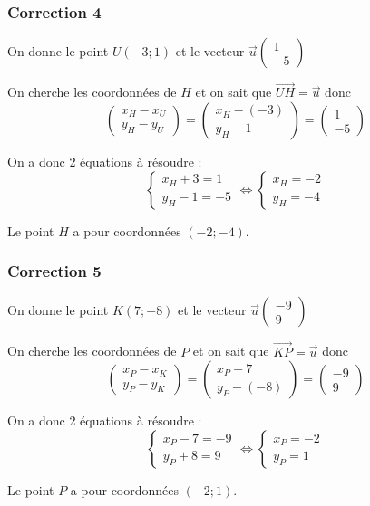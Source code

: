 \documentclass[15pt, mathserif]{beamer}
\begin{document}
\begin{frame}
\vspace{-10mm}
	\frametitle{Correction 4}
\vspace*{0.5cm} 
 On donne le point $U(-3;1)$ et le vecteur $\vec{u}\begin{pmatrix} 1\\ -5 \end{pmatrix}$ 
 
 On cherche les coordonnées de $H$ et on sait que $\vec{UH}=\vec{u}$ donc $$\begin{pmatrix} x_{H}-x_U \\ y_{H}-y_U \end{pmatrix}=\begin{pmatrix} x_{H}-\left(-3\right) \\ y_{H}-1\end{pmatrix}=\begin{pmatrix} 1 \\ -5 \end{pmatrix}$$ 
 
 On a donc 2 équations à résoudre :  
 $$ \left\{ \begin{array}{cc} 
  x_{H}+3=1 \\ 
  y_{H}-1=-5 
 \end{array} \right. \Leftrightarrow \left\{ \begin{array}{cc} 
  x_{H}=-2 \\ 
 y_{H}=-4 
 \end{array} \right. $$ 
 
 Le point $H$ a pour coordonnées $(-2;-4)$.\end{frame}


\begin{frame}
\vspace{-10mm}
	\frametitle{Correction 5}
\vspace*{0.5cm} 
 On donne le point $K(7;-8)$ et le vecteur $\vec{u}\begin{pmatrix} -9\\ 9 \end{pmatrix}$ 
 
 On cherche les coordonnées de $P$ et on sait que $\vec{KP}=\vec{u}$ donc $$\begin{pmatrix} x_{P}-x_K \\ y_{P}-y_K \end{pmatrix}=\begin{pmatrix} x_{P}-7 \\ y_{P}-\left(-8\right)\end{pmatrix}=\begin{pmatrix} -9 \\ 9 \end{pmatrix}$$ 
 
 On a donc 2 équations à résoudre :  
 $$ \left\{ \begin{array}{cc} 
  x_{P}-7=-9 \\ 
  y_{P}+8=9 
 \end{array} \right. \Leftrightarrow \left\{ \begin{array}{cc} 
  x_{P}=-2 \\ 
 y_{P}=1 
 \end{array} \right. $$ 
 
 Le point $P$ a pour coordonnées $(-2;1)$.\end{frame}
\end{document}
